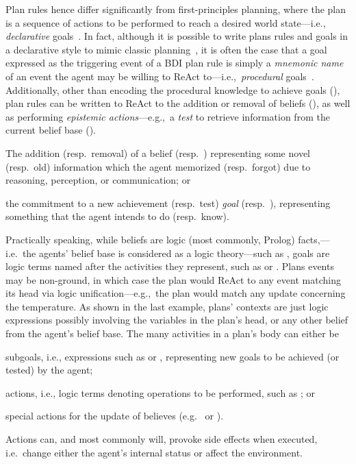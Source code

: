 \documentclass[12pt,a4paper,openright,twoside]{book}
\begin{document}
Plan rules hence differ significantly from first-principles planning, where the plan is a sequence of actions to be performed to reach a desired world state---i.e., \emph{declarative} goals~\cite{winikoff2002kr}.
%
In fact, although it is possible to write plans rules and goals in a declarative style to mimic classic planning~\cite{hubner2006dalt, HindriksBHM00}, it is often the case that a goal expressed as the triggering event of a \ac{BDI} plan rule is simply a \emph{mnemonic name} of an event the agent may be willing to \ac{ReAct} to---i.e.,\ \emph{procedural} goals~\cite{winikoff2002kr}.
%
Additionally, other than encoding the procedural knowledge to achieve goals (),
\agentspeak{} plan rules can be written to \ac{ReAct} to the addition or removal of beliefs (), as well as performing \emph{epistemic actions}---e.g.,\ a \emph{test} to retrieve information from the current belief base ().
%
\begin{inlinelist}
    \item The addition (resp.\ removal) of a belief  (resp.\ )
    representing some novel (resp.\ old) information which the agent memorized (resp.\ forgot)
    due to reasoning, perception, or communication; or
    \item the commitment to a new achievement (resp.\ test) \emph{goal}  (resp.\ ),
    representing something that the agent intends to do (resp.\ know).
\end{inlinelist}
%
Practically speaking, while beliefs are logic (most commonly, Prolog) facts,---i.e.\ the agents' belief base is considered as a logic theory---such as , goals are logic terms named after the activities they represent, such as  or .
%
Plans events may be non-ground, in which case the plan would \ac{ReAct} to any event matching its head via logic unification---e.g.,\ the plan  would match any update concerning the temperature.
%
As shown in the last example, plans' contexts are just logic expressions possibly involving
the variables in the plan's head, or any other belief from the agent's belief base.
%
The many activities in a plan's body can either be
%
\begin{inlinelist}
    \item subgoals, i.e., expressions such as  or ,
    representing new goals to be achieved (or tested) by the agent;
    \item actions, i.e., logic terms denoting operations to be performed,
    such as ; or
    \item special actions for the update of believes (e.g.\  or ). \end{inlinelist}
%
Actions can, and most commonly will, provoke side effects when executed, i.e.\ change either the agent's internal status or affect the environment.
\end{document}
